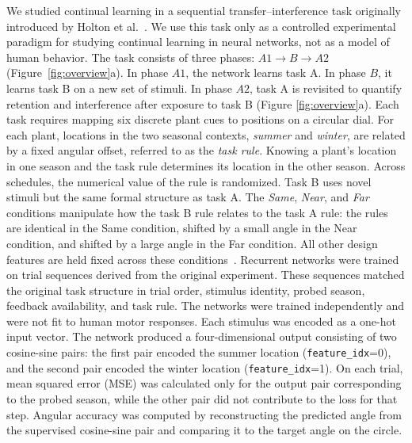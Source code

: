 \documentclass[letterpaper]{article}
\begin{document}
        We studied continual learning in a sequential transfer--interference task originally introduced by Holton et al.~\cite{holton2025humans}. We use this task only as a controlled experimental paradigm for studying continual learning in neural networks, not as a model of human behavior. The task consists of three phases: \(A1 \rightarrow B \rightarrow A2\) (Figure~\ref{fig:overview}a). In phase \(A1\), the network learns task A. In phase \(B\), it learns task B on a new set of stimuli. In phase \(A2\), task A is revisited to quantify retention and interference after exposure to task B (Figure \ref{fig:overview}a). Each task requires mapping six discrete plant cues to positions on a circular dial. For each plant, locations in the two seasonal contexts, \emph{summer} and \emph{winter}, are related by a fixed angular offset, referred to as the \emph{task rule}. Knowing a plant's location in one season and the task rule determines its location in the other season. Across schedules, the numerical value of the rule is randomized. Task B uses novel stimuli but the same formal structure as task A. The \emph{Same}, \emph{Near}, and \emph{Far} conditions manipulate how the task B rule relates to the task A rule: the rules are identical in the Same condition, shifted by a small angle in the Near condition, and shifted by a large angle in the Far condition. All other design features are held fixed across these conditions~\cite{holton2025humans}. Recurrent networks were trained on trial sequences derived from the original experiment. These sequences matched the original task structure in trial order, stimulus identity, probed season, feedback availability, and task rule. The networks were trained independently and were not fit to human motor responses. Each stimulus was encoded as a one-hot input vector. The network produced a four-dimensional output consisting of two cosine-sine pairs: the first pair encoded the summer location (\texttt{feature\_idx}=0), and the second pair encoded the winter location (\texttt{feature\_idx}=1). On each trial, mean squared error (MSE) was calculated only for the output pair corresponding to the probed season, while the other pair did not contribute to the loss for that step. Angular accuracy was computed by reconstructing the predicted angle from the supervised cosine-sine pair and comparing it to the target angle on the circle.
        
\end{document}
